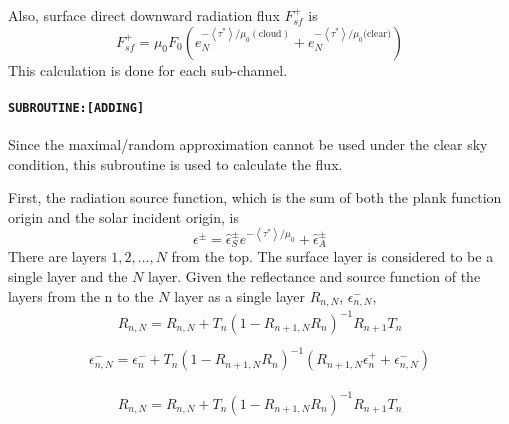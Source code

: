 Also, surface direct downward radiation flux \(F_{s f}^{+}\) is \begin{equation}
F_{s f}^{+}=\mu_{0} F_{0}\left(e_{N}^{-\left\langle\tau^{*}\right\rangle / \mu_{0}(\text {cloud})}+e_{N}^{-\left\langle\tau^{*}\right\rangle / \mu_{0} \text{(clear)}}\right)
\end{equation} This calculation is done for each sub-channel.

\hypertarget{subroutineadding}{%
\paragraph{\texorpdfstring{\texttt{SUBROUTINE:{[}ADDING{]}}}{SUBROUTINE:{[}ADDING{]}}}\label{subroutineadding}}

Since the maximal/random approximation cannot be used under the clear
sky condition, this subroutine is used to calculate the flux.

First, the radiation source function, which is the sum of both the plank
function origin and the solar incident origin, is \begin{equation}
\epsilon^{\pm}=\hat{\epsilon}_{S}^{\pm} e^{-\left\langle\tau^{*}\right\rangle / \mu_{0}}+\hat{\epsilon}_{A}^{\pm}
\end{equation} There are layers \(1, 2,\dots, N\) from the top. The surface layer is
considered to be a single layer and the \(N\) layer. Given the
reflectance and source function of the layers from the n to the \(N\)
layer as a single layer \(R_{n, N}\), \(\epsilon_{n, N}^{-}\), \begin{equation}
\begin{array}{c}
R_{n, N}=R_{n, N}+T_{n}\left(1-R_{n+1, N} R_{n}\right)^{-1} R_{n+1} T_{n} \\
\end{array}
\end{equation} \begin{equation}
\begin{array}{c}
\epsilon_{n, N}^{-}=\epsilon_{n}^{-}+T_{n}\left(1-R_{n+1, N} R_{n}\right)^{-1}\left(R_{n+1, N} \epsilon_{n}^{+}+\epsilon_{n, N}^{-}\right)
\end{array}
\end{equation}

\begin{equation}
\begin{array}{c}
R_{n, N}=R_{n, N}+T_{n}\left(1-R_{n+1, N} R_{n}\right)^{-1} R_{n+1} T_{n} \\
\end{array}
\end{equation}

